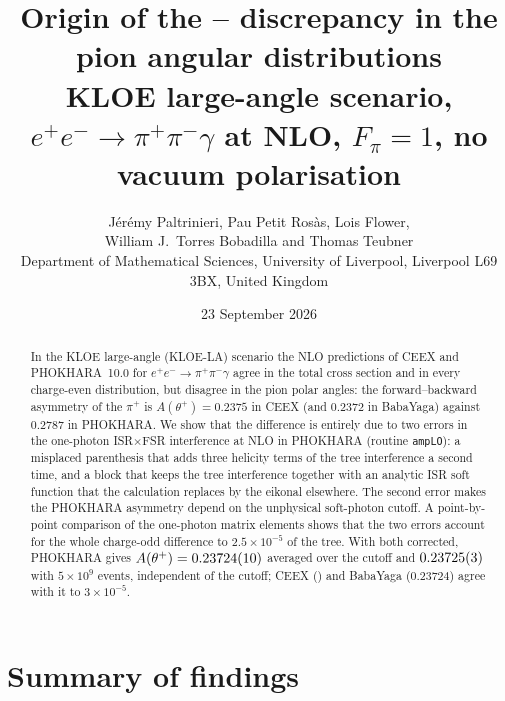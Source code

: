 \documentclass[11pt,a4paper]{article}
\title{\vspace{-1.2cm}\textbf{Origin of the \ceex--\phok{} discrepancy in the pion angular
  distributions}\\[4pt]\large KLOE large-angle scenario, $e^+e^-\to\pi^+\pi^-\gamma$ at NLO,
  $F_\pi=1$, no vacuum polarisation}
\author{Jérémy Paltrinieri, Pau Petit Rosàs, Lois Flower,\\
  William J.~Torres Bobadilla and Thomas Teubner\\[4pt]
  \small Department of Mathematical Sciences, University of Liverpool, Liverpool L69 3BX,
  United Kingdom}
\date{23 September 2026}
\newcommand{\code}[1]{\texttt{#1}}
\newcommand{\phok}{PHOKHARA}
\newcommand{\ceex}{CEEX}
\newcommand{\bby}{BabaYaga}
\newcommand{\Ath}{A(\theta^+)}
\begin{document}
\maketitle
\thispagestyle{fancy}

\begin{abstract}\noindent
In the KLOE large-angle (KLOE-LA) scenario the NLO predictions of \ceex{} and \phok{}~10.0
for $e^+e^-\to\pi^+\pi^-\gamma$ agree in the total cross section and in every charge-even
distribution, but disagree in the pion polar angles: the forward--backward asymmetry of the
$\pi^+$ is $\Ath=0.2375$ in \ceex{} (and $0.2372$ in \bby) against $0.2787$ in \phok.
We show that the difference is entirely due to two errors in the one-photon ISR$\times$FSR
interference at NLO in \phok{} (routine \code{ampLO}): a
misplaced parenthesis that adds three helicity terms of the tree interference a second time,
and a block that keeps the tree interference together with an analytic ISR soft function that
the calculation replaces by the eikonal elsewhere. The second error makes the \phok{}
asymmetry depend on the unphysical soft-photon cutoff. A point-by-point comparison of the
one-photon matrix elements shows that the two errors account for the whole charge-odd
difference to $2.5\times10^{-5}$ of the tree. With both corrected, \phok{} gives
$\Ath=\HiAav$ averaged over the cutoff and $0.23725(3)$ with $5\times10^9$ events, independent of
the cutoff; \ceex{} (\CeexA) and \bby{} ($0.23724$) agree with it to $3\times10^{-5}$.
\end{abstract}

\setcounter{tocdepth}{1}
\tableofcontents
\vspace{0.4cm}

\section{Summary of findings}
\label{sec:summary}
\end{document}
